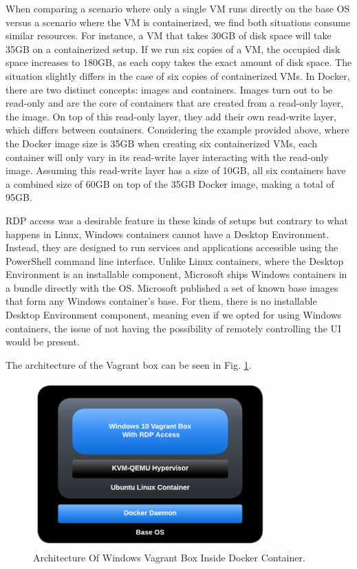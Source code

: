 When comparing a scenario where only a single VM runs directly on the base OS versus a scenario where the VM is containerized, we find both situations consume similar resources. For instance, a VM that takes 30GB of disk space will take 35GB on a containerized setup. If we run six copies of a VM, the occupied disk space increases to 180GB, as each copy takes the exact amount of disk space. The situation slightly differs in the case of six copies of containerized VMs. In Docker, there are two distinct concepts: images and containers. Images turn out to be read-only and are the core of containers that are created from a read-only layer, the image. On top of this read-only layer, they add their own read-write layer, which differs between containers. Considering the example provided above, where the Docker image size is 35GB when creating six containerized VMs, each container will only vary in its read-write layer interacting with the read-only image. Assuming this read-write layer has a size of 10GB, all six containers have a combined size of 60GB on top of the 35GB Docker image, making a total of 95GB.

RDP access was a desirable feature in these kinds of setups but contrary to what happens in Linux,  Windows containers cannot have a Desktop Environment. Instead, they are designed to run services and applications accessible using the PowerShell command line interface. Unlike Linux containers, where the Desktop Environment is an installable component, Microsoft ships Windows containers in a bundle directly with the OS. Microsoft published a set of known base images that form any Windows container's base. For them, there is no installable Desktop Environment component, meaning even if we opted for using Windows containers, the issue of not having the possibility of remotely controlling the UI would be present.

The architecture of the Vagrant box can be seen in Fig. \ref{fig:windows_vagrant_box_architecture}. 

\begin{figure}[H]
    \includegraphics[width=9cm]{figures/vagrant_box_container_diagram.pdf}
    \caption{Architecture Of Windows Vagrant Box Inside Docker Container.}
    \label{fig:windows_vagrant_box_architecture}
\end{figure}

